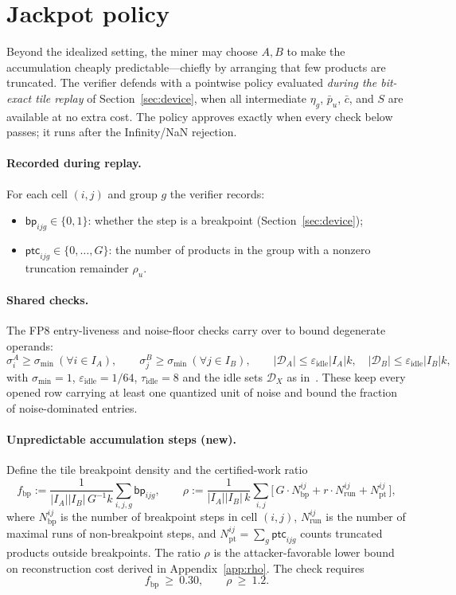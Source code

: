 \documentclass[11pt]{article}
\newcommand{\eps}{\varepsilon}
\newcommand{\FP}[1]{\textsf{FP#1}}
\newcommand{\sigmin}{\sigma_{\min}}
\begin{document}
\section{Jackpot policy}\label{sec:policy}

Beyond the idealized setting, the miner may choose $A,B$ to make the accumulation cheaply
predictable---chiefly by arranging that few products are truncated. The verifier defends with a
pointwise policy evaluated \emph{during the bit-exact tile replay} of Section~\ref{sec:device},
when all intermediate $\eta_g$, $\bar p_u$, $\bar c$, and $S$ are available at no extra cost. The
policy approves exactly when every check below passes; it runs after the Infinity/NaN rejection.

\paragraph{Recorded during replay.} For each cell $(i,j)$ and group $g$ the verifier records:
\begin{itemize}[nosep]
\item $\textsf{bp}_{ijg}\in\{0,1\}$: whether the step is a breakpoint (Section~\ref{sec:device});
\item $\textsf{ptc}_{ijg}\in\{0,\dots,G\}$: the number of products in the group with a nonzero
      truncation remainder $\rho_u$.
\end{itemize}

\paragraph{Shared checks.} The \FP{8} entry-liveness and noise-floor checks carry over to bound
degenerate operands:
\[
\sigma_i^A\ge\sigmin\ (\forall i\in I_A),\qquad \sigma_j^B\ge\sigmin\ (\forall j\in I_B),
\qquad |\mathcal D_A|\le\eps_{\text{idle}}|I_A|k,\quad |\mathcal D_B|\le\eps_{\text{idle}}|I_B|k,
\]
with $\sigmin=1$, $\eps_{\text{idle}}=1/64$, $\tau_{\text{idle}}=8$ and the idle sets $\mathcal D_X$
as in~\cite{PearlFP8}. These keep every opened row carrying at least one quantized unit of noise
and bound the fraction of noise-dominated entries.

\paragraph{Unpredictable accumulation steps (new).} Define the tile breakpoint density and the
certified-work ratio
\[
f_{\text{bp}} := \frac{1}{|I_A||I_B|\,G^{-1}k}\sum_{i,j,g}\textsf{bp}_{ijg},
\qquad
\rho := \frac{1}{|I_A||I_B|\,k}\sum_{i,j}\Big[\,G\cdot N^{ij}_{\text{bp}} + r\cdot N^{ij}_{\text{run}} + N^{ij}_{\text{pt}}\,\Big],
\]
where $N^{ij}_{\text{bp}}$ is the number of breakpoint steps in cell $(i,j)$, $N^{ij}_{\text{run}}$
is the number of maximal runs of non-breakpoint steps, and $N^{ij}_{\text{pt}}=\sum_g\textsf{ptc}_{ijg}$
counts truncated products outside breakpoints. The ratio $\rho$ is the attacker-favorable
lower bound on reconstruction cost derived in Appendix~\ref{app:rho}. The check requires
\begin{equation}\label{eq:policyfp16}
f_{\text{bp}}\ \ge\ 0.30,\qquad \rho\ \ge\ 1.2.
\end{equation}
\end{document}
